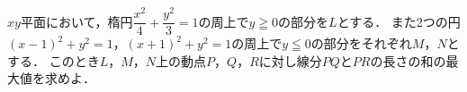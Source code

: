 \documentclass[../../main.tex]{subfiles}
\begin{document}
$xy$平面において，楕円$\displaystyle\dfrac{x^2}{4}+\dfrac{y^2}{3}=1$の周上で$y\geqq0$の部分を$L$とする．
また2つの円${(x-1)}^2+y^2=1$，${(x+1)}^2+y^2=1$の周上で$y\leqq0$の部分をそれぞれ$M$，$N$とする．
このとき$L$，$M$，$N$上の動点$P$，$Q$，$R$に対し線分$PQ$と$PR$の長さの和の最大値を求めよ．
\end{document}

